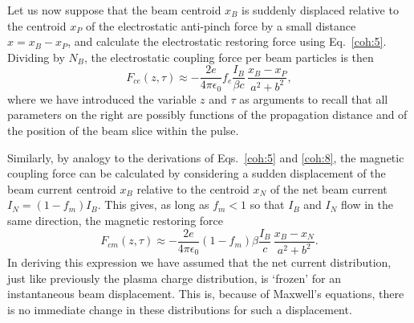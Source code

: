 \documentclass [12pt,a4paper,     ]{report} %
\begin{document}
   Let us now suppose that the beam centroid $x_B$ is suddenly displaced relative to the centroid $x_P$ of the electrostatic anti-pinch force by a small distance $x =x_B-x_P$, and calculate the electrostatic restoring force using Eq.~\eqref{coh:5}.  Dividing by $N_B$, the electrostatic coupling force per beam particles is then
%
\begin{equation}\label{coh:8} %
   F_{ce}(z,\tau) \approx  -\frac{2e}{4\pi \epsilon_0} f_e 
                      \frac{I_B}{\beta c} \, \frac{x_B-x_P}{a^2+b^2},
\end{equation}
%
where we have introduced the variable $z$ and $\tau$ as arguments to recall that all parameters on the right are possibly functions of the propagation distance and of the position of the beam slice within the pulse.

  Similarly, by analogy to the derivations of Eqs.~\eqref{coh:5} and \eqref{coh:8}, the magnetic coupling force can be calculated by considering a sudden displacement of the beam current centroid $x_B$ relative to the centroid $x_N$ of the net beam current $I_N=(1-f_m)I_B$.  This gives, as long as $f_m < 1$ so that $I_B$ and $I_N$ flow in the same direction, the magnetic restoring force
%
\begin{equation}\label{coh:9} %
   F_{cm}(z,\tau) \approx  -\frac{2e}{4\pi \epsilon_0} (1-f_m)
                      \beta \frac{I_B}{c} \, \frac{x_B-x_N}{a^2+b^2}.
\end{equation}
%
In deriving this expression we have assumed that the net current distribution,  just like previously the plasma charge distribution, is `frozen' for an instantaneous beam displacement. This is, because of Maxwell's equations, there is no immediate change in these distributions for such a displacement.
\end{document}
